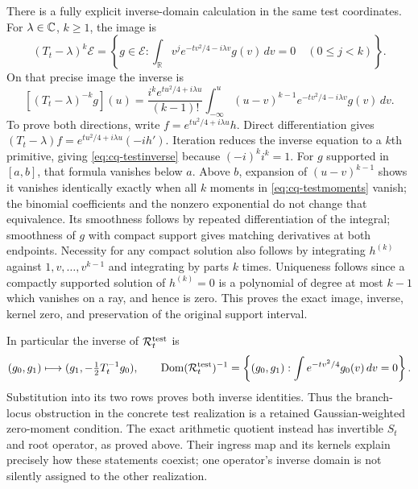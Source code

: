 There is a fully explicit inverse-domain calculation in the same
test coordinates. For $\lambda\in\mathbb C$, $k\geq1$, the image is
\begin{equation}\label{eq:cq-testmoments}
 (T_t-\lambda)^k\mathcal E
 =\left\{g\in\mathcal E:
 \int_{\mathbb R}v^j e^{-tv^2/4-i\lambda v}g(v)\,dv=0
                  \quad(0\leq j<k)\right\}.
\end{equation}
On that precise image the inverse is
\begin{equation}\label{eq:cq-testinverse}
 [(T_t-\lambda)^{-k}g](u)
 =\frac{i^ke^{tu^2/4+i\lambda u}}{(k-1)!}
 \int_{-\infty}^{u}(u-v)^{k-1}
            e^{-tv^2/4-i\lambda v}g(v)\,dv.
\end{equation}
To prove both directions, write
$f=e^{tu^2/4+i\lambda u}h$.
Direct differentiation gives
$(T_t-\lambda)f=e^{tu^2/4+i\lambda u}(-i h')$.
Iteration reduces the inverse equation to a $k$th primitive, giving
\eqref{eq:cq-testinverse} because $(-i)^ki^k=1$.
For $g$ supported in $[a,b]$, that formula vanishes below $a$.
Above $b$, expansion of $(u-v)^{k-1}$ shows it vanishes identically
exactly when all $k$ moments in \eqref{eq:cq-testmoments} vanish;
the binomial coefficients and the nonzero exponential do not change
that equivalence. Its smoothness follows by repeated differentiation
of the integral; smoothness of $g$ with compact support gives
matching derivatives at both endpoints. Necessity for any compact
solution also follows by integrating $h^{(k)}$ against
$1,v,\ldots,v^{k-1}$ and integrating by parts $k$ times.
Uniqueness follows since a compactly supported solution of
$h^{(k)}=0$ is a polynomial of degree at most $k-1$ which vanishes
on a ray, and hence is zero. This proves the exact image, inverse,
kernel zero, and preservation of the original support interval.

In particular the inverse of $\mathcal R_t^{\rm test}$ is
\[
 (g_0,g_1)\longmapsto(g_1,-\tfrac12T_t^{-1}g_0),
 \qquad
 \operatorname{Dom}(\mathcal R_t^{\rm test})^{-1}
 =\left\{(g_0,g_1):\int e^{-tv^2/4}g_0(v)\,dv=0\right\}.
\]
Substitution into its two rows proves both inverse identities.
Thus the branch-locus obstruction in the concrete test realization
is a retained Gaussian-weighted zero-moment condition. The exact
arithmetic quotient instead has invertible $S_t$ and root operator,
as proved above. Their ingress map and its kernels explain precisely
how these statements coexist; one operator's inverse domain is not
silently assigned to the other realization.

